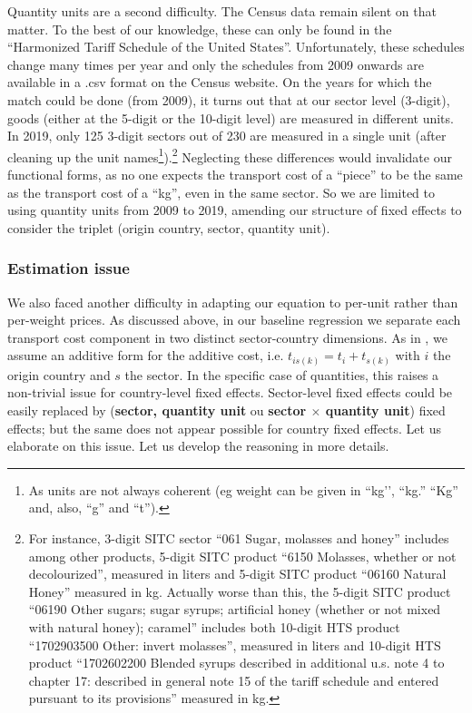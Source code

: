 \documentclass[a4paper,11pt]{article}
\begin{document}
Quantity units are a second difficulty. The Census data remain silent on that matter. To the best of our knowledge, these can only be found in the ``Harmonized Tariff Schedule of the United States''. Unfortunately, these schedules change many times per year and only the schedules from 2009 onwards are available in a .csv format on the Census website. On the years for which the match could be done (from 2009), it turns out that at our sector level (3-digit), goods (either at the 5-digit or the 10-digit level) are measured in different units. In 2019, only 125 3-digit sectors out of 230 are measured in a single unit (after cleaning up the unit names\footnote{As units are not always coherent (eg weight can be given in ``kg’’, ``kg.'' ``Kg'' and, also, ``g'' and ``t'').}).\footnote{For instance, 3-digit SITC sector ``061 Sugar, molasses and honey'' includes among other products, 5-digit SITC product ``6150 Molasses, whether or not decolourized'', measured in liters and 5-digit SITC product ``06160 Natural Honey'' measured in kg. Actually worse than this, the 5-digit SITC product ``06190 Other sugars; sugar syrups; artificial honey (whether or not mixed with natural honey); caramel'' includes both 10-digit HTS product ``1702903500 Other: invert molasses'', measured in liters and 10-digit HTS product ``1702602200 Blended syrups described in additional u.s. note 4 to chapter 17: described in general note 15 of the tariff schedule and entered pursuant to its provisions''  measured in kg.} Neglecting these differences would invalidate our functional forms, as no one expects the transport cost of a ``piece'' to be the same as the transport cost of a ``kg'', even in the same sector.
So we are limited to using quantity units from 2009 to 2019, amending our structure of fixed effects to consider the triplet (origin country, sector, quantity unit).

\subsubsection{Estimation issue}

We also faced another difficulty in adapting our equation to per-unit rather than per-weight prices. As discussed above, in our baseline regression we separate each transport cost component in two distinct sector-country dimensions. As in \cite{Irrazabal_2015}, we assume an additive form for the additive cost, i.e. $t_{is(k)} = t_i+t_{s(k)}$ with $i$ the origin country and $s$ the sector. In the specific case of quantities, this raises a non-trivial issue for country-level fixed effects. Sector-level fixed effects could be easily replaced by (\textbf{sector, quantity unit} ou \textbf{sector $\times$ quantity unit}) fixed effects; but the same does not appear possible for country fixed effects. Let us elaborate on this issue. Let us develop the reasoning in more details.
\end{document}
